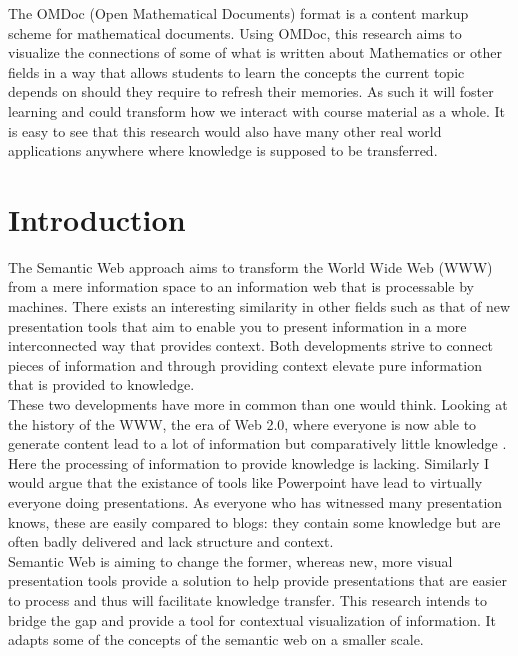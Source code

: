 \documentclass[twoside]{article}
\begin{document}
The OMDoc (Open Mathematical Documents) format \cite{Kohlhase:OMDoc1.2} is a content markup scheme for mathematical documents. Using OMDoc, this research aims to visualize the connections of some of what is written about Mathematics or other fields in a way that allows students to learn the concepts the current topic depends on should they require to refresh their memories. As such it will foster learning and could transform how we interact with course material as a whole. It is easy to see that this research would also have many other real world applications anywhere where knowledge is supposed to be transferred.\\ 

  \newpage
  \tableofcontents

  \clearpage

  \section{Introduction}

The Semantic Web \cite{BernersLee:tsw98} approach aims to transform the World Wide Web (WWW) from a mere information space to an information web that is processable by machines. There exists an interesting similarity in other fields such as that of new presentation tools that aim to enable you to present information in a more interconnected way that provides context. Both developments strive to connect pieces of information and through providing context elevate pure information that is provided to knowledge.\\

These two developments have more in common than one would think. Looking at the history of the WWW, the era of Web 2.0, where everyone is now able to generate content lead to a lot of information but comparatively little knowledge \cite{Weller:npentrel14}. Here the processing of information to provide knowledge is lacking. Similarly I would argue that the existance of tools like Powerpoint have lead to virtually everyone doing presentations. As everyone who has witnessed many presentation knows, these are easily compared to blogs: they contain some knowledge but are often badly delivered and lack structure and context.\\

Semantic Web is aiming to change the former, whereas new, more visual presentation tools provide a solution to help provide presentations that are easier to process and thus will facilitate knowledge transfer. This research intends to bridge the gap and provide a tool for contextual visualization of information. It adapts some of the concepts of the semantic web on a smaller scale.
\end{document}
